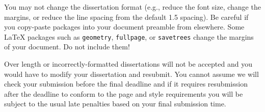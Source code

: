 \documentclass[bsc,frontabs,singlespacing,parskip,deptreport]{infthesis}
\begin{document}
You may not change the dissertation format (e.g., reduce the font size, change
the margins, or reduce the line spacing from the default 1.5 spacing). Be
careful if you copy-paste packages into your document preamble from elsewhere.
Some \LaTeX{} packages such as \texttt{geometry}, \texttt{fullpage}, or
\texttt{savetrees} change the margins of your document. Do not include them!

Over length or incorrectly-formatted dissertations will not be accepted and you
would have to modify your dissertation and resubmit. You cannot assume we will
check your submission before the final deadline and if it requires resubmission
after the deadline to conform to the page and style requirements you will be
subject to the usual late penalties based on your final submission time.




%
%
%
\end{document}
